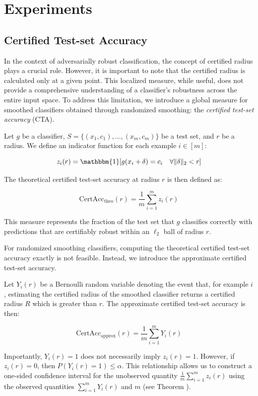 \section{Experiments}\label{sec:experiments}

\subsection{Certified Test-set Accuracy}\label{subsec:certified-test-set-accuracy}
In the context of adversarially robust classification, the concept of certified radius plays a crucial role.
However, it is important to note that the certified radius is calculated only at a given point.
This localized measure, while useful, does not provide a comprehensive understanding of a classifier's robustness across the entire input space.
To address this limitation, we introduce a global measure for smoothed classifiers obtained through randomized smoothing: the \textit{certified test-set accuracy} (CTA).

Let $g$ be a classifier, $S = \{(x_1, c_1), \ldots, (x_m, c_m)\}$ be a test set, and $r$ be a radius.
We define an indicator function for each example $i \in [m]$:

\[
    z_i(r) = \mathbbm{1}[g(x_i + \delta) = c_i \quad \forall \|\delta\|_2 < r]
\]

The theoretical certified test-set accuracy at radius $r$ is then defined as:

\[
    \text{CertAcc}_{\text{theo}}(r) = \frac{1}{m} \sum_{i=1}^m z_i(r)
\]

This measure represents the fraction of the test set that $g$ classifies correctly with predictions that are certifiably robust within an $\ell_2$ ball of radius $r$.

For randomized smoothing classifiers, computing the theoretical certified test-set accuracy exactly is not feasible.
Instead, we introduce the approximate certified test-set accuracy.

Let $Y_i(r)$ be a Bernoulli random variable denoting the event that, for example $i$, estimating the certified radius of the smoothed classifier returns a certified radius $R$ which is greater than $r$.
The approximate certified test-set accuracy is then:


\[
    \text{CertAcc}_{\text{approx}}(r) = \frac{1}{m} \sum_{i=1}^m Y_i(r)
\]

Importantly, $Y_i(r) = 1$ does not necessarily imply $z_{i}(r) = 1$.
However, if $z_i(r) = 0$, then $P(Y_i(r) = 1) \leq \alpha$.
This relationship allows us to construct a one-sided confidence interval for the unobserved quantity $\frac{1}{m} \sum_{i=1}^m z_{i}(r)$ using the observed quantities $\sum_{i=1}^m Y_i(r)$ and $m$ (see Theorem ).

